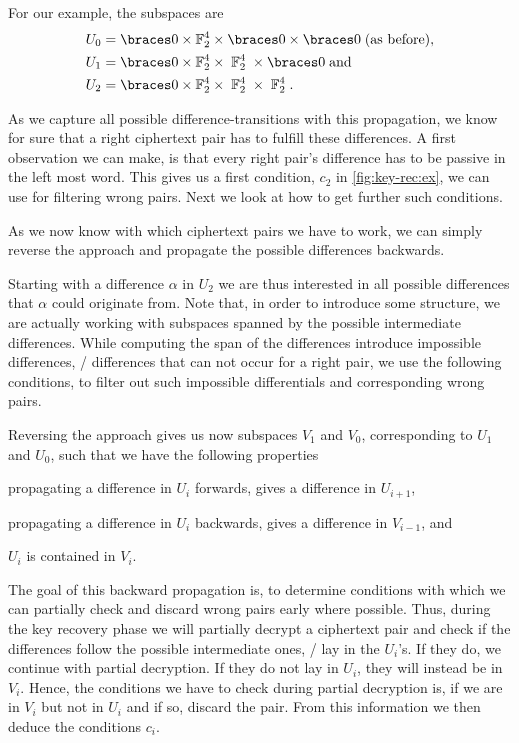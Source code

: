 For our example, the subspaces are
\begin{align*}
    U_0 &= \set{0} \times \F_2^4 \times \set{0} \times \set{0}\;\text{(as before)},\\
    U_1 &= \set{0} \times \F_2^4 \times \;\F_2^4\; \times \set{0}\;\text{and}\\
    U_2 &= \set{0} \times \F_2^4 \times \;\F_2^4\; \times \;\F_2^4\;.
\end{align*}

As we capture all possible difference-transitions with this propagation, we know for sure that a right ciphertext pair has to fulfill these differences.
A first observation we can make, is that every right pair's difference has to be passive in the left most word.
This gives us a first condition, $c_2$ in \cref{fig:key-rec:ex}, we can use for filtering wrong pairs.
Next we look at how to get further such conditions.


As we now know with which ciphertext pairs we have to work, we can simply reverse the approach and propagate the possible differences backwards.

Starting with a difference $\alpha$ in $U_2$ we are thus interested in all possible differences that $\alpha$ could originate from.
Note that, in order to introduce some structure, we are actually working with subspaces spanned by the possible intermediate differences.
While computing the span of the differences introduce impossible differences, \ie/ differences that can not occur for a right pair, we use the following conditions, to filter out such impossible differentials and corresponding wrong pairs.

Reversing the approach gives us now subspaces $V_1$ and $V_0$, corresponding to $U_1$ and $U_0$, such that we have the following properties
\begin{inparaenum}
    \item propagating a difference in $U_i$ forwards, gives a difference in $U_{i+1}$,
    \item propagating a difference in $U_i$ backwards, gives a difference in $V_{i-1}$, and
    \item $U_i$ is contained in $V_i$.
\end{inparaenum}
The goal of this backward propagation is, to determine conditions with which we can partially check and discard wrong pairs early where possible.
Thus, during the key recovery phase we will partially decrypt a ciphertext pair and check if the differences follow the possible intermediate ones, \ie/ lay in the $U_i$'s.
If they do, we continue with partial decryption.
If they do not lay in $U_i$, they will instead be in $V_i$.
Hence, the conditions we have to check during partial decryption is, if we are in $V_i$ but not in $U_i$ and if so, discard the pair.
From this information we then deduce the conditions $c_i$.

